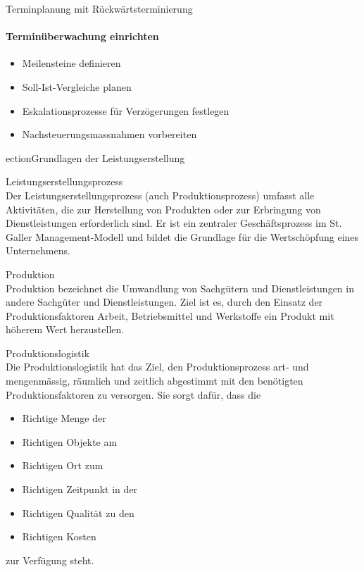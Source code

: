 \begin{KR}{Terminplanung mit Rückwärtsterminierung}
\paragraph{Terminüberwachung einrichten}
\begin{itemize}
    \item Meilensteine definieren
    \item Soll-Ist-Vergleiche planen
    \item Eskalationsprozesse für Verzögerungen festlegen
    \item Nachsteuerungsmassnahmen vorbereiten
\end{itemize}
\end{KR}ection{Grundlagen der Leistungserstellung}

\begin{definition}{Leistungserstellungsprozess}\\
Der Leistungserstellungsprozess (auch Produktionsprozess) umfasst alle Aktivitäten, die zur Herstellung von Produkten oder zur Erbringung von Dienstleistungen erforderlich sind. Er ist ein zentraler Geschäftsprozess im St. Galler Management-Modell und bildet die Grundlage für die Wertschöpfung eines Unternehmens.
\end{definition}

\begin{definition}{Produktion}\\
Produktion bezeichnet die Umwandlung von Sachgütern und Dienstleistungen in andere Sachgüter und Dienstleistungen. Ziel ist es, durch den Einsatz der Produktionsfaktoren Arbeit, Betriebsmittel und Werkstoffe ein Produkt mit höherem Wert herzustellen.
\end{definition}

\begin{definition}{Produktionslogistik}\\
Die Produktionslogistik hat das Ziel, den Produktionsprozess art- und mengenmässig, räumlich und zeitlich abgestimmt mit den benötigten Produktionsfaktoren zu versorgen. Sie sorgt dafür, dass die
\begin{itemize}
    \item Richtige Menge der
    \item Richtigen Objekte am
    \item Richtigen Ort zum
    \item Richtigen Zeitpunkt in der
    \item Richtigen Qualität zu den
    \item Richtigen Kosten
\end{itemize}
zur Verfügung steht.
\end{definition}

